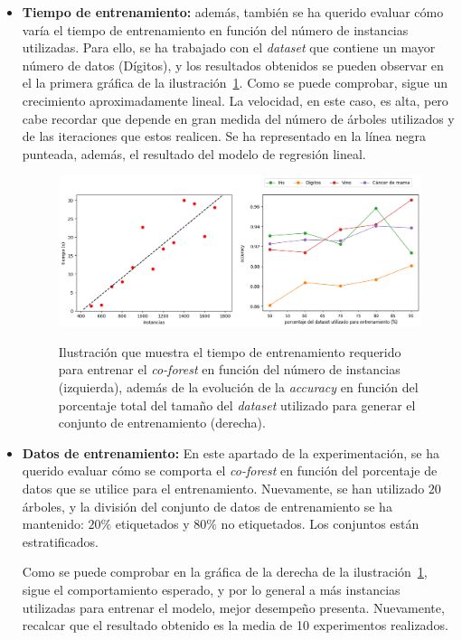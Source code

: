 \begin{itemize}
	\item \textbf{Tiempo de entrenamiento:} además, también se ha querido evaluar cómo varía el tiempo de entrenamiento en función del número de instancias utilizadas. Para ello, se ha trabajado con el \textit{dataset} que contiene un mayor número de datos (Dígitos), y los resultados obtenidos se pueden observar en el la primera gráfica de la ilustración~\ref{cf:cf_time-percentage}. Como se puede comprobar, sigue un crecimiento aproximadamente lineal. La velocidad, en este caso, es alta, pero cabe recordar que depende en gran medida del número de árboles utilizados y de las iteraciones que estos realicen. Se ha representado en la línea negra punteada, además, el resultado del modelo de regresión lineal.

\begin{figure}[h]
	\caption[\textit{Co-Forest}: resultados (tiempo-porcentaje)]{Ilustración que muestra el tiempo de entrenamiento requerido para entrenar el \textit{co-forest} en función del número de instancias (izquierda), además de la evolución de la \textit{accuracy} en función del porcentaje total del tamaño del \textit{dataset} utilizado para generar el conjunto de entrenamiento (derecha).}
	\centering
	\includegraphics[width=\textwidth]{../img/memoria/5_coforest_time-percentage}
	\label{cf:cf_time-percentage}
\end{figure}


	\item \textbf{Datos de entrenamiento:} En este apartado de la experimentación, se ha querido evaluar cómo se comporta el \textit{co-forest} en función del porcentaje de datos que se utilice para el entrenamiento. Nuevamente, se han utilizado  $20$ árboles, y la división del conjunto de datos de entrenamiento se ha mantenido: $20\%$ etiquetados y $80\%$ no etiquetados. Los conjuntos están estratificados.
	
	Como se puede comprobar en la gráfica de la derecha de la ilustración~\ref{cf:cf_time-percentage}, sigue el comportamiento esperado, y por lo general a más instancias utilizadas para entrenar el modelo, mejor desempeño presenta. Nuevamente, recalcar que el resultado obtenido es la media de 10 experimentos realizados.
	

\end{itemize}
